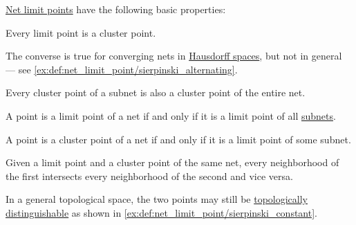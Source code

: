 \begin{proposition}\label{thm:def:net_limit_point}
  \hyperref[def:net_limit_point]{Net limit points} have the following basic properties:

  \begin{thmenum}
     Every limit point is a cluster point.

    The converse is true for converging nets in \hyperref[def:separation_axioms/T2]{Hausdorff spaces}, but not in general --- see \cref{ex:def:net_limit_point/sierpinski_alternating}.

     Every cluster point of a subnet is also a cluster point of the entire net.

     A point is a limit point of a net if and only if it is a limit point of all \hyperref[def:subnet]{subnets}.

     A point is a cluster point of a net if and only if it is a limit point of some subnet.

     Given a limit point and a cluster point of the same net, every neighborhood of the first intersects every neighborhood of the second and vice versa.

    In a general topological space, the two points may still be \hyperref[def:topologically_indistinguishable]{topologically distinguishable} as shown in \cref{ex:def:net_limit_point/sierpinski_constant}.
  \end{thmenum}
\end{proposition}
